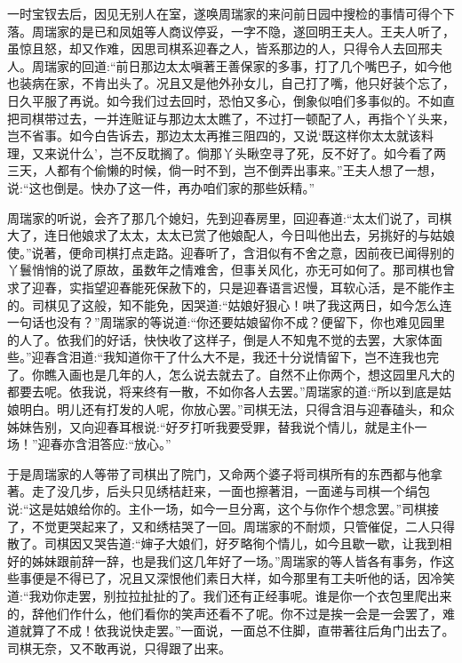 \begin{parag}
    一时宝钗去后，因见无别人在室，遂唤周瑞家的来问前日园中搜检的事情可得个下落。周瑞家的是已和凤姐等人商议停妥，一字不隐，遂回明王夫人。王夫人听了，虽惊且怒，却又作难，因思司棋系迎春之人，皆系那边的人，只得令人去回邢夫人。周瑞家的回道:“前日那边太太嗔著王善保家的多事，打了几个嘴巴子，如今他也装病在家，不肯出头了。况且又是他外孙女儿，自己打了嘴，他只好装个忘了，日久平服了再说。如今我们过去回时，恐怕又多心，倒象似咱们多事似的。不如直把司棋带过去，一并连赃证与那边太太瞧了，不过打一顿配了人，再指个丫头来，岂不省事。如今白告诉去，那边太太再推三阻四的，又说‘既这样你太太就该料理，又来说什么’，岂不反耽搁了。倘那丫头瞅空寻了死，反不好了。如今看了两三天，人都有个偷懒的时候，倘一时不到，岂不倒弄出事来。”王夫人想了一想，说:“这也倒是。快办了这一件，再办咱们家的那些妖精。”
\end{parag}


\begin{parag}
    周瑞家的听说，会齐了那几个媳妇，先到迎春房里，回迎春道:“太太们说了，司棋大了，连日他娘求了太太，太太已赏了他娘配人，今日叫他出去，另挑好的与姑娘使。”说著，便命司棋打点走路。迎春听了，含泪似有不舍之意，因前夜已闻得别的丫鬟悄悄的说了原故，虽数年之情难舍，但事关风化，亦无可如何了。那司棋也曾求了迎春，实指望迎春能死保赦下的，只是迎春语言迟慢，耳软心活，是不能作主的。司棋见了这般，知不能免，因哭道:“姑娘好狠心！哄了我这两日，如今怎么连一句话也没有？”周瑞家的等说道:“你还要姑娘留你不成？便留下，你也难见园里的人了。依我们的好话，快快收了这样子，倒是人不知鬼不觉的去罢，大家体面些。”迎春含泪道:“我知道你干了什么大不是，我还十分说情留下，岂不连我也完了。你瞧入画也是几年的人，怎么说去就去了。自然不止你两个，想这园里凡大的都要去呢。依我说，将来终有一散，不如你各人去罢。”周瑞家的道:“所以到底是姑娘明白。明儿还有打发的人呢，你放心罢。”司棋无法，只得含泪与迎春磕头，和众姊妹告别，又向迎春耳根说:“好歹打听我要受罪，替我说个情儿，就是主仆一场！”迎春亦含泪答应:“放心。”
\end{parag}


\begin{parag}
    于是周瑞家的人等带了司棋出了院门，又命两个婆子将司棋所有的东西都与他拿著。走了没几步，后头只见绣桔赶来，一面也擦著泪，一面递与司棋一个绢包说:“这是姑娘给你的。主仆一场，如今一旦分离，这个与你作个想念罢。”司棋接了，不觉更哭起来了，又和绣桔哭了一回。周瑞家的不耐烦，只管催促，二人只得散了。司棋因又哭告道:“婶子大娘们，好歹略徇个情儿，如今且歇一歇，让我到相好的姊妹跟前辞一辞，也是我们这几年好了一场。”周瑞家的等人皆各有事务，作这些事便是不得已了，况且又深恨他们素日大样，如今那里有工夫听他的话，因冷笑道:“我劝你走罢，别拉拉扯扯的了。我们还有正经事呢。谁是你一个衣包里爬出来的，辞他们作什么，他们看你的笑声还看不了呢。你不过是挨一会是一会罢了，难道就算了不成！依我说快走罢。”一面说，一面总不住脚，直带著往后角门出去了。司棋无奈，又不敢再说，只得跟了出来。
\end{parag}


